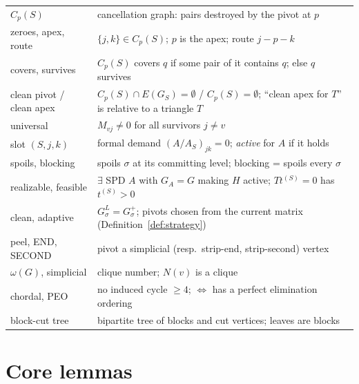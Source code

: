 \documentclass[11pt]{article}
\theoremstyle{plain}
\theoremstyle{definition}
\begin{document}
\begin{aiblock}
\begin{table}[H]
\begin{tabular}{ll}
$C_p(S)$ & cancellation graph: pairs destroyed by the pivot at $p$\\
zeroes, apex, route & $\{j,k\}\in C_p(S)$; $p$ is the apex; route $j\!-\!p\!-\!k$\\
covers, survives & $C_p(S)$ covers $q$ if some pair of it contains $q$; else $q$ survives\\
clean pivot / clean apex & $C_p(S)\cap E(G_S)=\emptyset$ / $C_p(S)=\emptyset$; ``clean apex for $T$'' is relative to a triangle $T$\\
universal & $M_{vj}\neq0$ for all survivors $j\neq v$\\
slot $(S,j,k)$ & formal demand $(A/A_S)_{jk}=0$; \emph{active} for $A$ if it holds\\
spoils, blocking & spoils $\sigma$ at its committing level; blocking = spoils every $\sigma$\\
realizable, feasible & $\exists$ SPD $A$ with $G_A=G$ making $H$ active; $Tt^{(S)}=0$ has $t^{(S)}>0$\\
clean, adaptive & $G^L_\sigma=G^+_\sigma$; pivots chosen from the current matrix (Definition~\ref{def:strategy})\\
peel, END, SECOND & pivot a simplicial (resp.\ strip-end, strip-second) vertex\\
$\omega(G)$, simplicial & clique number; $N(v)$ is a clique\\
chordal, PEO & no induced cycle $\ge4$; $\iff$ has a perfect elimination ordering \cite{Dirac,Fulkerson}\\
block-cut tree & bipartite tree of blocks and cut vertices; leaves are blocks\\
\bottomrule
\end{tabular}
\end{table}
\end{aiblock}

\section{Core lemmas}\label{sec:core}
\end{document}
